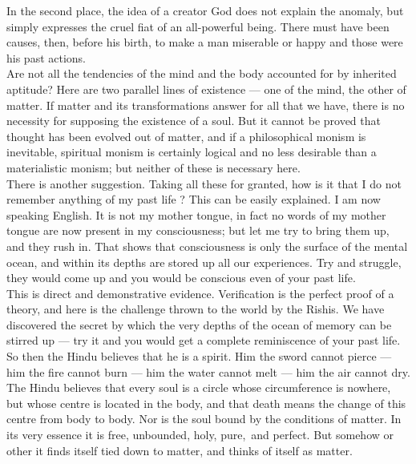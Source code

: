 In the second place, the idea of a creator God does not
explain the anomaly, but simply expresses the cruel fiat of an
all-powerful being. There must have been causes, then, before his
birth, to make a man miserable or happy and those were his past actions.\\

Are not all the tendencies of the mind and the body accounted
for by inherited aptitude? Here are two parallel lines of existence —
one of the mind, the other of matter. If matter and its transformations
answer for all that we have, there is no necessity for supposing the
existence of a soul. But it cannot be proved that thought has been
evolved out of matter, and if a philosophical monism is inevitable,
spiritual monism is certainly logical and no less desirable than a
materialistic monism; but neither of these is necessary here.\\

There is another suggestion. Taking all these for granted, how
is it that I do not remember anything of my past life ? This can be
easily explained. I am now speaking English. It is not my mother
tongue, in fact no words of my mother tongue are now present in my
consciousness; but let me try to bring them up, and they rush in. That
shows that consciousness is only the surface of the mental ocean, and
within its depths are stored up all our experiences. Try and struggle,
they would come up and you would be conscious even of your past life.\\

This is direct and demonstrative evidence. Verification is the
perfect proof of a theory, and here is the challenge thrown to the
world by the Rishis. We have discovered the secret by which the very
depths of the ocean of memory can be stirred up — try it and you would
get a complete reminiscence of your past life.\\

So then the Hindu believes that he is a spirit. Him the sword
cannot pierce — him the fire cannot burn — him the water cannot melt —
him the air cannot dry. The Hindu believes that every soul is a circle
whose circumference is nowhere, but whose centre is located in the
body, and that death means the change of this centre from body to body.
Nor is the soul bound by the conditions of matter. In its very essence
it is free, unbounded, holy, pure, and perfect. But somehow or
other it finds itself tied down to matter, and thinks of itself as
matter.\\

